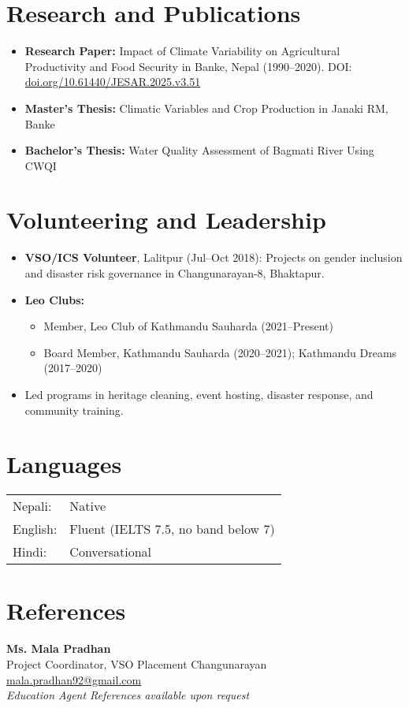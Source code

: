 \documentclass[11pt,a4paper]{article}
\begin{document}
\section*{Research and Publications}
\begin{itemize}[leftmargin=*]
    \item \textbf{Research Paper:} Impact of Climate Variability on Agricultural Productivity and Food Security in Banke, Nepal (1990–2020). DOI: \href{https://doi.org/10.61440/JESAR.2025.v3.51}{doi.org/10.61440/JESAR.2025.v3.51}
    \item \textbf{Master's Thesis:} Climatic Variables and Crop Production in Janaki RM, Banke
    \item \textbf{Bachelor's Thesis:} Water Quality Assessment of Bagmati River Using CWQI
\end{itemize}

\section*{Volunteering and Leadership}
\begin{itemize}[leftmargin=*]
    \item \textbf{VSO/ICS Volunteer}, Lalitpur (Jul--Oct 2018): Projects on gender inclusion and disaster risk governance in Changunarayan-8, Bhaktapur.
    \item \textbf{Leo Clubs:}
    \begin{itemize}
        \item Member, Leo Club of Kathmandu Sauharda (2021--Present)
        \item Board Member, Kathmandu Sauharda (2020--2021); Kathmandu Dreams (2017--2020)
    \end{itemize}
    \item Led programs in heritage cleaning, event hosting, disaster response, and community training.
\end{itemize}

\section*{Languages}
\begin{tabular}{@{}ll@{}}
Nepali: & Native \\
English: & Fluent (IELTS 7.5, no band below 7) \\
Hindi: & Conversational \\
\end{tabular}

\section*{References}
\textbf{Ms. Mala Pradhan} \\
Project Coordinator, VSO Placement Changunarayan \\
\href{mailto:mala.pradhan92@gmail.com}{mala.pradhan92@gmail.com} \\
\textit{Education Agent References available upon request}
\end{document}
